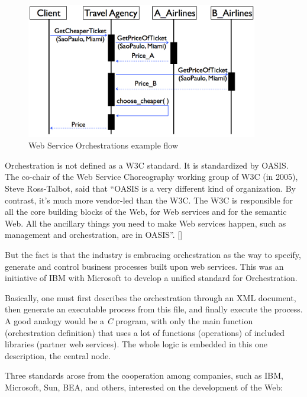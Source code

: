 \begin{figure}[htb]
  \centering
  \includegraphics[width=0.9\textwidth]{images/BPELexample}
  \caption{Web Service Orchestrations example flow}
  \label{BPELexample}
\end{figure}

Orchestration is not defined as a W3C standard. It is standardized by OASIS. The co-chair of the Web Service Choreography working group of W3C (in 2005), Steve Ross-Talbot, said that ``OASIS is a very different kind of organization. By contrast, it's much more vendor-led than the W3C. The W3C is responsible for all the core building blocks of the Web, for Web services and for the semantic Web. All the ancillary things you need to make Web services happen, such as management and orchestration, are in OASIS''. [\citet{INTERVIEW}]

But the fact is that the industry is embracing orchestration as the way to specify, generate and control business processes built upon web services. This was an initiative of IBM with Microsoft to develop a unified standard for Orchestration.

Basically, one must first describes the orchestration through an XML document, then generate an executable process from this file, and finally execute the process. A good analogy would be a \emph{C} program, with only the main function (orchestration definition) that uses a lot of functions (operations) of included libraries (partner web services). The whole logic is embedded in this one description, the central node. 

Three standards arose from the cooperation among companies, such as IBM, Microsoft, Sun, BEA, and others, interested on the development of the Web:

